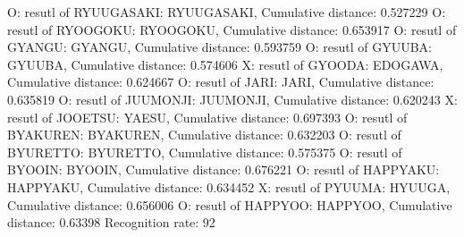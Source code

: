 O: resutl of RYUUGASAKI: RYUUGASAKI, Cumulative distance: 0.527229
O: resutl of RYOOGOKU: RYOOGOKU, Cumulative distance: 0.653917
O: resutl of GYANGU: GYANGU, Cumulative distance: 0.593759
O: resutl of GYUUBA: GYUUBA, Cumulative distance: 0.574606
X: resutl of GYOODA: EDOGAWA, Cumulative distance: 0.624667
O: resutl of JARI: JARI, Cumulative distance: 0.635819
O: resutl of JUUMONJI: JUUMONJI, Cumulative distance: 0.620243
X: resutl of JOOETSU: YAESU, Cumulative distance: 0.697393
O: resutl of BYAKUREN: BYAKUREN, Cumulative distance: 0.632203
O: resutl of BYURETTO: BYURETTO, Cumulative distance: 0.575375
O: resutl of BYOOIN: BYOOIN, Cumulative distance: 0.676221
O: resutl of HAPPYAKU: HAPPYAKU, Cumulative distance: 0.634452
X: resutl of PYUUMA: HYUUGA, Cumulative distance: 0.656006
O: resutl of HAPPYOO: HAPPYOO, Cumulative distance: 0.63398
Recognition rate: 92%
